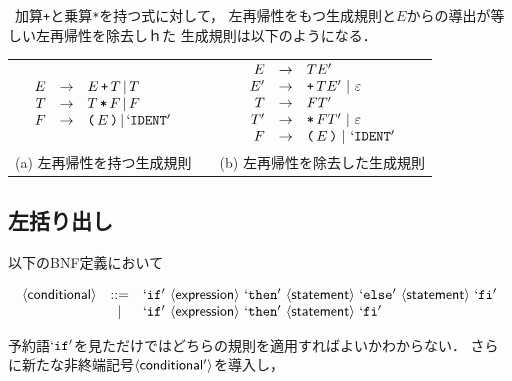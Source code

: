 \documentclass[a4j,dvipdfmx]{jbook}
\begin{document}
\begin{Exmp}\ 加算\texttt{+}と乗算\texttt{*}を持つ式に対して，
  左再帰性をもつ生成規則と$E$からの導出が等しい左再帰性を除去しｈた
  生成規則は以下のようになる．
  \begin{center}
    \begin{tabular}{ccc}
      $\begin{array}{rcl}
           E & \rightarrow & E\,\texttt{+}\,T\,|\,T                     \\
           T & \rightarrow & T\,\texttt{*}\,F\,|\,F                     \\
           F & \rightarrow & \texttt{(}\,E\,\texttt{)}\,|\,`\mbox{$\mathtt{IDENT}$}'
         \end{array}$
                      &  &
      $\begin{array}{rcl}
           E  & \rightarrow & TE'                                        \\
           E' & \rightarrow & \texttt{+}\,TE'\ |\ \varepsilon            \\
           T  & \rightarrow & FT'                                        \\
           T' & \rightarrow & \texttt{*}\,FT'\ |\ \varepsilon            \\
           F  & \rightarrow & \texttt{(}\,E\,\texttt{)}\ |\ \Term{IDENT}
         \end{array}$ \\
      (a) 左再帰性を持つ生成規則 &  & (b) 左再帰性を除去した生成規則
    \end{tabular}
  \end{center}
\end{Exmp}

\subsection{左括り出し}

以下のBNF定義において

\[\begin{array}{rcl}
    \NTerm{conditional} & \mathtt{::=} & \Term{if}\ \NTerm{expression}\ \Term{then}\ \NTerm{statement}\ \Term{else}\ \NTerm{statement}\ \Term{fi} \\
                        & |            & \Term{if}\ \NTerm{expression}\ \Term{then}\ \NTerm{statement}\ \Term{fi}
  \end{array}\]

予約語$`\mbox{$\mathtt{if}$}'$を見ただけではどちらの規則を適用すればよいかわからない．
さらに新たな非終端記号$\langle{\mbox{$\mathsf{conditional'}$}}\rangle$を導入し，
\end{document}
